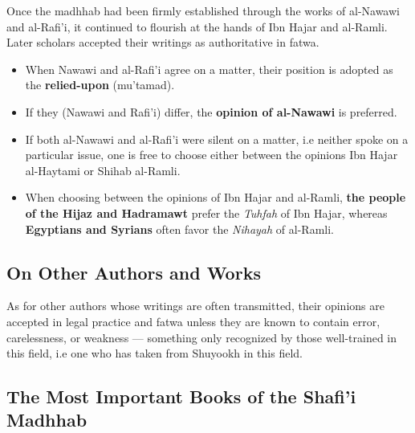 \documentclass[
  a4paper,
  DIV=11,
  numbers=noendperiod]{scrartcl}
\providecommand{\tightlist}{%
  \setlength{\itemsep}{0pt}\setlength{\parskip}{0pt}}
\begin{document}
\begin{tcolorbox}[enhanced jigsaw, titlerule=0mm, opacitybacktitle=0.6, toptitle=1mm, opacityback=0, left=2mm, breakable, rightrule=.15mm, arc=.35mm, colframe=quarto-callout-note-color-frame, leftrule=.75mm, colback=white, colbacktitle=quarto-callout-note-color!10!white, coltitle=black, bottomtitle=1mm, title=\textcolor{quarto-callout-note-color}{\faInfo}\hspace{0.5em}{The Authority of Ibn Hajar and al-Ramli}, toprule=.15mm, bottomrule=.15mm]

Once the madhhab had been firmly established through the works of
al-Nawawi and al-Rafi'i, it continued to flourish at the hands of Ibn
Hajar and al-Ramli. Later scholars accepted their writings as
authoritative in fatwa.

\begin{itemize}
\tightlist
\item
  When Nawawi and al-Rafi'i agree on a matter, their position is adopted
  as the \textbf{relied-upon} (mu'tamad).
\item
  If they (Nawawi and Rafi'i) differ, the \textbf{opinion of al-Nawawi}
  is preferred.
\item
  If both al-Nawawi and al-Rafi'i were silent on a matter, i.e neither
  spoke on a particular issue, one is free to choose either between the
  opinions Ibn Hajar al-Haytami or Shihab al-Ramli.
\item
  When choosing between the opinions of Ibn Hajar and al-Ramli,
  \textbf{the people of the Hijaz and Hadramawt} prefer the
  \emph{Tuhfah} of Ibn Hajar, whereas \textbf{Egyptians and Syrians}
  often favor the \emph{Nihayah} of al-Ramli.
\end{itemize}

\end{tcolorbox}

\subsection{On Other Authors and
Works}\label{on-other-authors-and-works}

As for other authors whose writings are often transmitted, their
opinions are accepted in legal practice and fatwa unless they are known
to contain error, carelessness, or weakness --- something only
recognized by those well-trained in this field, i.e one who has taken
from Shuyookh in this field.

\subsection{The Most Important Books of the Shafi'i
Madhhab}\label{the-most-important-books-of-the-shafii-madhhab}
\end{document}
